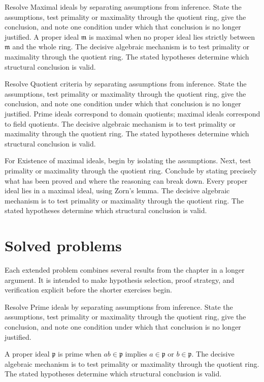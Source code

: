 \begin{example}\label{ex:v02-worked-02}
Resolve Maximal ideals by separating assumptions from inference. State the assumptions, test primality or maximality through the quotient ring, give the conclusion, and note one condition under which that conclusion is no longer justified. A proper ideal $\mathfrak m$ is maximal when no proper ideal lies strictly between $\mathfrak m$ and the whole ring. The decisive algebraic mechanism is to test primality or maximality through the quotient ring. The stated hypotheses determine which structural conclusion is valid.
\end{example}

\begin{example}\label{ex:v02-worked-03}
Resolve Quotient criteria by separating assumptions from inference. State the assumptions, test primality or maximality through the quotient ring, give the conclusion, and note one condition under which that conclusion is no longer justified. Prime ideals correspond to domain quotients; maximal ideals correspond to field quotients. The decisive algebraic mechanism is to test primality or maximality through the quotient ring. The stated hypotheses determine which structural conclusion is valid.
\end{example}

\begin{example}\label{ex:v02-worked-04}
For Existence of maximal ideals, begin by isolating the assumptions. Next, test primality or maximality through the quotient ring. Conclude by stating precisely what has been proved and where the reasoning can break down. Every proper ideal lies in a maximal ideal, using Zorn's lemma. The decisive algebraic mechanism is to test primality or maximality through the quotient ring. The stated hypotheses determine which structural conclusion is valid.
\end{example}

\section{Solved problems}
Each extended problem combines several results from the chapter in a longer argument. It is intended to make hypothesis selection, proof strategy, and verification explicit before the shorter exercises begin.

\begin{problem}\label{prob:v02-problem-01}
Resolve Prime ideals by separating assumptions from inference. State the assumptions, test primality or maximality through the quotient ring, give the conclusion, and note one condition under which that conclusion is no longer justified.
\end{problem}
\begin{solution}
A proper ideal $\mathfrak p$ is prime when $ab\in\mathfrak p$ implies $a\in\mathfrak p$ or $b\in\mathfrak p$. The decisive algebraic mechanism is to test primality or maximality through the quotient ring. The stated hypotheses determine which structural conclusion is valid.
\end{solution}

